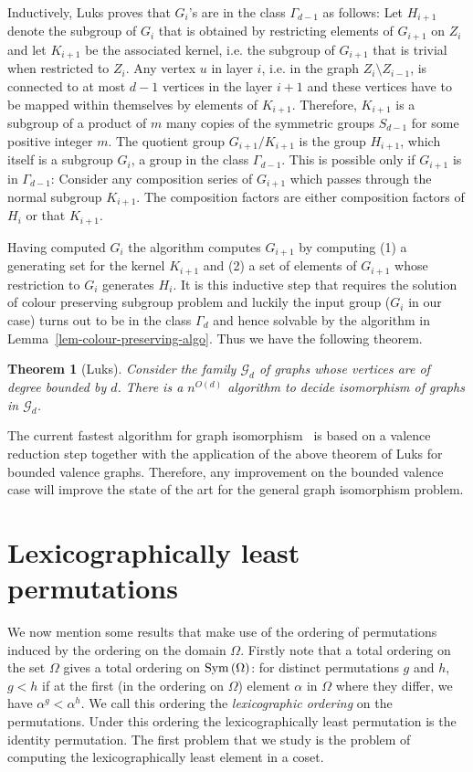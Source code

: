 \documentclass{article}
\newtheorem{theorem}{Theorem}[section]
\begin{document}
Inductively, Luks proves that $G_i$'s are in the class $\Gamma_{d-1}$
as follows: Let $H_{i+1}$ denote the subgroup of $G_i$ that is
obtained by restricting elements of $G_{i+1}$ on $Z_i$ and let
$K_{i+1}$ be the associated kernel, i.e. the subgroup of $G_{i+1}$
that is trivial when restricted to $Z_i$. Any vertex $u$ in layer $i$,
i.e. in the graph $Z_i\setminus Z_{i-1}$, is connected to at most
$d-1$ vertices in the layer $i+1$ and these vertices have to be mapped
within themselves by elements of $K_{i+1}$. Therefore, $K_{i+1}$ is a
subgroup of a product of $m$ many copies of the symmetric groups
$S_{d-1}$ for some positive integer $m$. The quotient group
$G_{i+1}/K_{i+1}$ is the group $H_{i+1}$, which itself is a subgroup
$G_i$, a group in the class $\Gamma_{d-1}$. This is possible only if
$G_{i+1}$ is in $\Gamma_{d-1}$: Consider any composition series of
$G_{i+1}$ which passes through the normal subgroup $K_{i+1}$. The
composition factors are either composition factors of $H_i$ or that
$K_{i+1}$.

Having computed $G_i$ the algorithm computes $G_{i+1}$ by computing
(1) a generating set for the kernel $K_{i+1}$ and (2) a set of
elements of $G_{i+1}$ whose restriction to $G_i$ generates $H_i$. It
is this inductive step that requires the solution of colour preserving
subgroup problem and luckily the input group ($G_i$ in our case) turns
out to be in the class $\Gamma_d$ and hence solvable by the algorithm
in Lemma~\ref{lem-colour-preserving-algo}. Thus we have the following
theorem.

\begin{theorem}[Luks]
  Consider the family $\mathcal{G}_d$ of graphs whose vertices are of
  degree bounded by $d$. There is a $n^{O(d)}$ algorithm to decide
  isomorphism of graphs in $\mathcal{G}_d$.
\end{theorem}

The current fastest algorithm for graph
isomorphism~\cite{zemlyachenko85gi} is based on a valence reduction
step together with the application of the above theorem of Luks for
bounded valence graphs. Therefore, any improvement on the bounded
valence case will improve the state of the art for the general graph
isomorphism problem.

\section{Lexicographically least permutations}

We now mention some results that make use of the ordering of
permutations induced by the ordering on the domain $\Omega$. Firstly
note that a total ordering on the set $\Omega$ gives a total ordering
on $\mathrm{Sym}\left(\Omega\right)$: for distinct permutations $g$ and $h$, $g < h$ if
at the first (in the ordering on $\Omega$) element $\alpha$ in
$\Omega$ where they differ, we have $\alpha^g < \alpha^h$. We call
this ordering the \emph{lexicographic ordering} on the
permutations. Under this ordering the lexicographically least
permutation is the identity permutation. The first problem that we
study is the problem of computing the lexicographically least element
in a coset.
\end{document}
